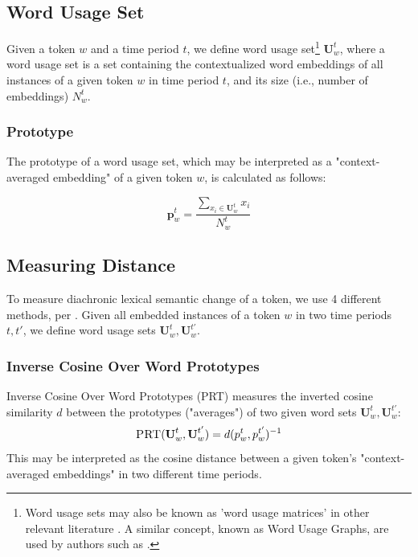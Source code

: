 \documentclass[10pt, a4paper]{article}
\begin{document}
\subsection{Word Usage Set}
Given a token $w$ and a time period $t$, we define word usage set\footnote{Word usage sets may also be known as 'word usage matrices' in other relevant literature \cite{Kutuzov2020,Giulianelli2020}. A similar concept, known as Word Usage Graphs, are used by authors such as .} $\textbf{U}^{t}_w$, where a word usage set is a set containing the contextualized word embeddings of all instances of a given token $w$ in time period $t$, and its size (i.e., number of embeddings) $N^t_w$.

\subsubsection{Prototype}
The prototype of a word usage set, which may be interpreted as a "context-averaged embedding" of a given token $w$, is calculated as follows:

$$\textbf{p}^t_w = \frac{\sum_{x_i \in \textbf{U}^t_w} x_i}{N^t_w}$$

\subsection{Measuring Distance}
\label{distance}
To measure diachronic lexical semantic change of a token, we use 4 different methods, per . Given all embedded instances of a token $w$ in two time periods $t, t'$, we define word usage sets $\textbf{U}^{t}_w, \textbf{U}^{t'}_w$.

\subsubsection{Inverse Cosine Over Word Prototypes}
Inverse Cosine Over Word Prototypes (PRT) measures the inverted cosine similarity $d$ between the prototypes ("averages") of two given word sets $\textbf{U}^{t}_w, \textbf{U}^{t'}_w$:
$$\textsc{PRT}(\textbf{U}^{t}_w, \textbf{U}^{t'}_w) = d(p^{t}_w, p^{t'}_w)^{-1}$$
This may be interpreted as the cosine distance between a given token's "context-averaged embeddings" in two different time periods.
\end{document}
